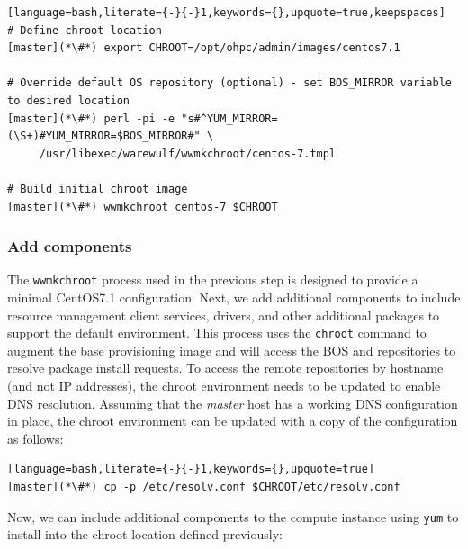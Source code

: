 \documentclass[letterpaper]{article}
\newcommand{\baseOS}{CentOS7.1}
\begin{document}
\begin{lstlisting}[language=bash,literate={-}{-}1,keywords={},upquote=true,keepspaces]
# Define chroot location 
[master](*\#*) export CHROOT=/opt/ohpc/admin/images/centos7.1

# Override default OS repository (optional) - set BOS_MIRROR variable to desired location
[master](*\#*) perl -pi -e "s#^YUM_MIRROR=(\S+)#YUM_MIRROR=$BOS_MIRROR#" \
     /usr/libexec/warewulf/wwmkchroot/centos-7.tmpl

# Build initial chroot image
[master](*\#*) wwmkchroot centos-7 $CHROOT
\end{lstlisting}

\subsubsection{Add \OHPC{} components} \label{sec:add_components}

The \texttt{wwmkchroot} process used in the previous step is designed to
provide a minimal \baseOS{} configuration. Next, we add additional components to
include resource management client services, \InfiniBand{} drivers, and other
additional packages to support the default \OHPC{} environment.  This process uses
the \texttt{chroot} command to augment the base provisioning image and will
access the BOS and \OHPC{} repositories to resolve package install requests. To
access the remote repositories by hostname (and not IP addresses), the chroot
environment needs to be updated to enable DNS resolution. Assuming that
the {\em master} host has a working DNS configuration in place, the chroot environment can
be updated with a copy of the configuration as follows:

\begin{lstlisting}[language=bash,literate={-}{-}1,keywords={},upquote=true]
[master](*\#*) cp -p /etc/resolv.conf $CHROOT/etc/resolv.conf
\end{lstlisting}

Now, we can include additional components to the compute instance using
\texttt{yum} to install into the chroot location defined previously:
\end{document}
